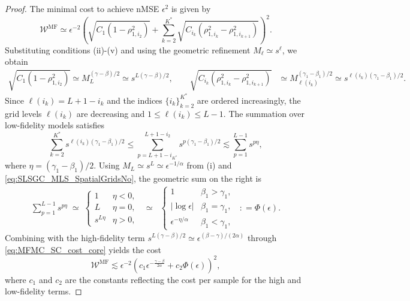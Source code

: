 \begin{proof}
The minimal cost to achieve nMSE $\epsilon^2$ is given by
\begin{equation}\label{eq:MFMC_SC_cost_core}
\mathcal{W}^{\mathrm{MF}} \simeq \epsilon^{-2} \left( \sqrt{C_1 \left(1 - \rho_{1,i_2}^2\right)} + \sum_{k=2}^{K^*} \sqrt{C_{i_k} \left(\rho_{1,i_k}^2 - \rho_{1,i_{k+1}}^2\right)} \right)^2.
\end{equation}
Substituting conditions (ii)-(v) and using the geometric refinement $M_\ell \simeq s^\ell$, we obtain
%
\begin{align*}
\sqrt{C_1 \left(1 - \rho_{1,i_2}^2\right)} \simeq M_L^{(\gamma - \beta)/2} \simeq s^{L(\gamma - \beta)/2}, \qquad \sqrt{C_{i_k} \left(\rho_{1,i_k}^2 - \rho_{1,i_{k+1}}^2\right)} &\simeq M_{\ell(i_k)}^{(\gamma_1 - \beta_1)/2} \simeq s^{\ell(i_k)(\gamma_1 - \beta_1)/2}.
\end{align*}
%
Since $\ell(i_k) = L + 1 - i_k$ and the indices $\{i_k\}_{k=2}^{K^*}$ are ordered increasingly, the grid levels $\ell(i_k)$ are decreasing and $1\le \ell(i_k)\le L-1$. The summation over low-fidelity models satisfies
%
\[
\sum_{k=2}^{K^*} s^{\ell(i_k)(\gamma_1 - \beta_1)/2} \leq \sum_{p = L + 1 - i_{K^*}}^{L+1-i_2} s^{p (\gamma_1 - \beta_1)/2}\lesssim\sum_{p=1}^{L-1} s^{p\eta},
\]
%
where $\eta = (\gamma_1 - \beta_1)/2$. Using $M_L \simeq s^L \simeq \epsilon^{-1/\alpha}$ from (i) and \eqref{eq:SLSGC_MLS_SpatialGridsNo}, the geometric sum on the right is
%
\begin{align*}
\sum_{p=1}^{L-1} s^{p\eta} \;\simeq \;\begin{cases} 
1 & \eta < 0, \\
L & \eta = 0, \\
s^{L\eta} & \eta > 0, 
\end{cases}
\;\;\simeq \;\;
\begin{cases} 
1 & \beta_1 > \gamma_1, \\
|\log \epsilon| & \beta_1 = \gamma_1, \\
\epsilon^{-\eta/\alpha} & \beta_1 < \gamma_1,
\end{cases} \;\;: = \Phi(\epsilon).
\end{align*}
%
Combining with the high-fidelity term $s^{L(\gamma - \beta)/2} \simeq \epsilon^{(\beta - \gamma)/(2\alpha)}$ through \eqref{eq:MFMC_SC_cost_core} yields the cost
%
\[
\mathcal{W}^{\mathrm{MF}} \lesssim \epsilon^{-2} \left( c_1 \epsilon^{-\frac{\gamma-\beta}{2\alpha}} + c_2 \Phi(\epsilon) \right)^2,
\]
where $c_1$ and $c_2$ are the constants reflecting the cost per sample for the high and low-fidelity terms. 

\end{proof}
